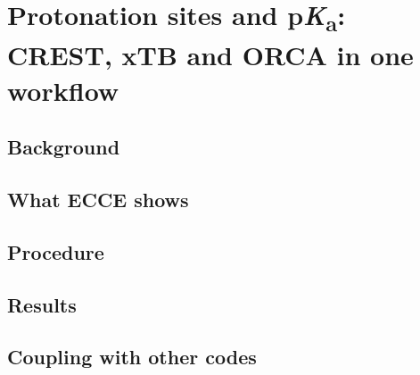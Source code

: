 \chapter{Protonation sites and p\textit{K}\textsubscript{a}: CREST, xTB and ORCA in one workflow}
\label{ch:protonation}


\section{Background}

\section{What ECCE shows}

\section{Procedure}

\section{Results}

\section{Coupling with other codes}

